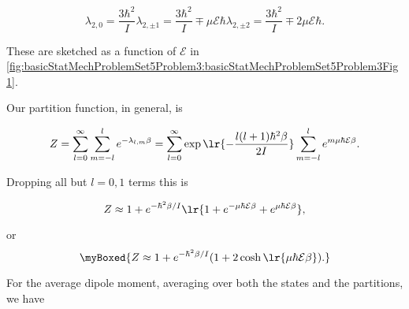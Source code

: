 {\begin{subequations}
\begin{equation}\label{eqn:basicStatMechProblemSet5Problem3:160}
\lambda_{2,0} = \frac{3 \hbar^2}{I} 
\end{equation}
\begin{equation}\label{eqn:basicStatMechProblemSet5Problem3:180}
\lambda_{2,\pm 1} = \frac{3 \hbar^2}{I} \mp \mu \mathcal{E} \hbar
\end{equation}
\begin{equation}\label{eqn:basicStatMechProblemSet5Problem3:200}
\lambda_{2,\pm 2} = \frac{3 \hbar^2}{I} \mp 2 \mu \mathcal{E} \hbar.
\end{equation}
\end{subequations}

These are sketched as a function of $\mathcal{E}$ in \cref{fig:basicStatMechProblemSet5Problem3:basicStatMechProblemSet5Problem3Fig1}.



Our partition function, in general, is

\begin{dmath}\label{eqn:basicStatMechProblemSet5Problem3:220}
Z 
= \sum_{l = 0}^\infty \sum_{m = -l}^l e^{-\lambda_{l,m} \beta}
= \sum_{l = 0}^\infty \exp\lr{ -\frac{l (l+1) \hbar^2 \beta}{2 I}} \sum_{m = -l}^l e^{ m \mu \hbar \mathcal{E} \beta}.
\end{dmath}

Dropping all but $l = 0, 1$ terms this is

\begin{equation}\label{eqn:basicStatMechProblemSet5Problem3:380}
Z 
\approx 
1 + e^{-\hbar^2 \beta/I} 
\lr{ 1 + e^{- \mu \hbar \mathcal{E} \beta } + e^{ \mu \hbar \mathcal{E} \beta}},
\end{equation}

or
\begin{equation}\label{eqn:basicStatMechProblemSet5Problem3:400}
\myBoxed{
Z 
\approx 
1 + e^{-\hbar^2 \beta/I} (
1 + 2 \cosh
\lr{ \mu \hbar \mathcal{E} \beta}
).
}
\end{equation}


For the average dipole moment, averaging over both the states and the partitions, we have

}
